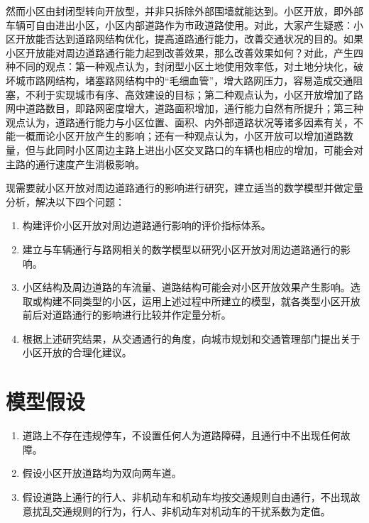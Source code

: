 \documentclass[fontset=fandol,a4paper,12pt]{ctexart}
\begin{document}
	然而小区由封闭型转向开放型，并非只拆除外部围墙就能达到。小区开放，即外部车辆可自由进出小区，小区内部道路作为市政道路使用。对此，大家产生疑惑：小区开放能否达到道路网结构优化，提高道路通行能力，改善交通状况的目的。如果小区开放能对周边道路通行能力起到改善效果，那么改善效果如何？对此，产生四种不同的观点：第一种观点认为，封闭型小区土地使用效率低，对土地分块化，破坏城市路网结构，堵塞路网结构中的“毛细血管”，增大路网压力，容易造成交通阻塞，不利于实现城市有序、高效建设的目标；第二种观点认为，小区开放增加了路网中道路数目，即路网密度增大，道路面积增加，通行能力自然有所提升；第三种观点认为，道路通行能力与小区位置、面积、内外部道路状况等诸多因素有关，不能一概而论小区开放产生的影响；还有一种观点认为，小区开放可以增加道路数量，但与此同时小区周边主路上进出小区交叉路口的车辆也相应的增加，可能会对主路的通行速度产生消极影响。

	现需要就小区开放对周边道路通行的影响进行研究，建立适当的数学模型并做定量分析，解决以下四个问题：
\begin{enumerate}
	\item 构建评价小区开放对周边道路通行影响的评价指标体系。
	\item 建立与车辆通行与路网相关的数学模型以研究小区开放对周边道路通行的影响。
	\item 小区结构及周边道路的车流量、道路结构可能会对小区开放效果产生影响。选取或构建不同类型的小区，运用上述过程中所建立的模型，就各类型小区开放前后对道路通行的影响进行比较并作定量分析。
	\item 根据上述研究结果，从交通通行的角度，向城市规划和交通管理部门提出关于小区开放的合理化建议。
\end{enumerate}
  \section{模型假设}
  \begin{enumerate}
  	\item 道路上不存在违规停车，不设置任何人为道路障碍，且通行中不出现任何故障。
  	\item 假设小区开放道路均为双向两车道。
  	\item 假设道路上通行的行人、非机动车和机动车均按交通规则自由通行，不出现故意扰乱交通规则的行为，行人、非机动车对机动车的干扰系数为定值。
  \end{enumerate}
\end{document}
